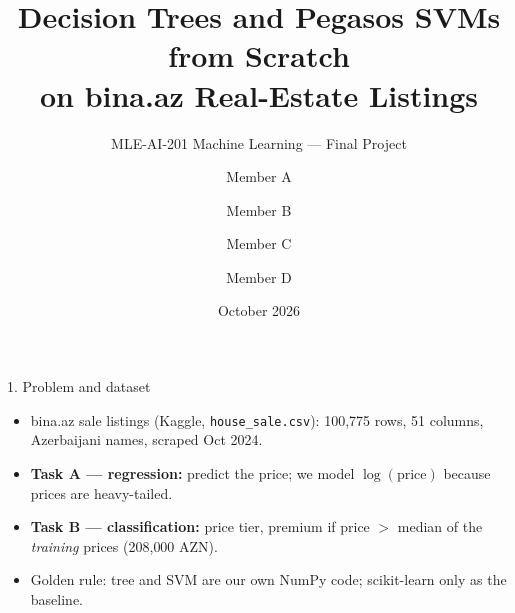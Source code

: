 \documentclass[aspectratio=169,10pt]{beamer}
\title{Decision Trees and Pegasos SVMs from Scratch\\on bina.az Real-Estate Listings}
\subtitle{MLE-AI-201 Machine Learning --- Final Project}
\author{Member A \and Member B \and Member C \and Member D}
\date{October 2026}
\begin{document}
\begin{frame}
  \titlepage
\end{frame}

\begin{frame}{1. Problem and dataset}
  \begin{itemize}
    \item bina.az sale listings (Kaggle, \texttt{house\_sale.csv}):
          100{,}775 rows, 51 columns, Azerbaijani names, scraped Oct 2024.
    \item \textbf{Task A --- regression:} predict the price; we model
          $\log(\text{price})$ because prices are heavy-tailed.
    \item \textbf{Task B --- classification:} price tier, premium if
          price $>$ median of the \emph{training} prices (208{,}000 AZN).
    \item Golden rule: tree and SVM are our own NumPy code;
          scikit-learn only as the baseline.
  \end{itemize}
\end{frame}
\end{document}
